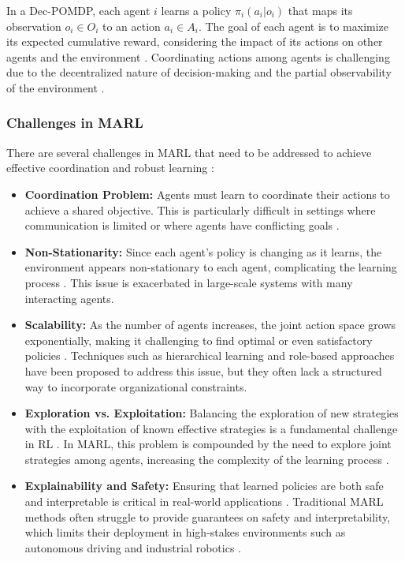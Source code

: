 \documentclass[sigconf,anonymous]{aamas}
\begin{document}
In a Dec-POMDP, each agent $i$ learns a policy $\pi_i(a_i | o_i)$ that maps its observation $o_i \in O_i$ to an action $a_i \in A_i$. The goal of each agent is to maximize its expected cumulative reward, considering the impact of its actions on other agents and the environment \cite{foerster2016learning, lowe2017multi}. Coordinating actions among agents is challenging due to the decentralized nature of decision-making and the partial observability of the environment \cite{foerster2018counterfactual}.


\subsubsection{Challenges in MARL}
There are several challenges in MARL that need to be addressed to achieve effective coordination and robust learning \cite{hernandez2019survey}:

\begin{itemize}
    \item \textbf{Coordination Problem:} Agents must learn to coordinate their actions to achieve a shared objective. This is particularly difficult in settings where communication is limited or where agents have conflicting goals \cite{lowe2017multi, foerster2018counterfactual}.
    \item \textbf{Non-Stationarity:} Since each agent's policy is changing as it learns, the environment appears non-stationary to each agent, complicating the learning process \cite{hernandez2019survey}. This issue is exacerbated in large-scale systems with many interacting agents.
    \item \textbf{Scalability:} As the number of agents increases, the joint action space grows exponentially, making it challenging to find optimal or even satisfactory policies \cite{yang2018mean, chu2020multi}. Techniques such as hierarchical learning and role-based approaches have been proposed to address this issue, but they often lack a structured way to incorporate organizational constraints.
    \item \textbf{Exploration vs. Exploitation:} Balancing the exploration of new strategies with the exploitation of known effective strategies is a fundamental challenge in RL \cite{mataric1997using}. In MARL, this problem is compounded by the need to explore joint strategies among agents, increasing the complexity of the learning process \cite{foerster2016learning}.
    \item \textbf{Explainability and Safety:} Ensuring that learned policies are both safe and interpretable is critical in real-world applications \cite{ghosal2021explainable, bastani2018verifiable}. Traditional MARL methods often struggle to provide guarantees on safety and interpretability, which limits their deployment in high-stakes environments such as autonomous driving and industrial robotics \cite{camara2020symbolic}.
\end{itemize}
\end{document}
